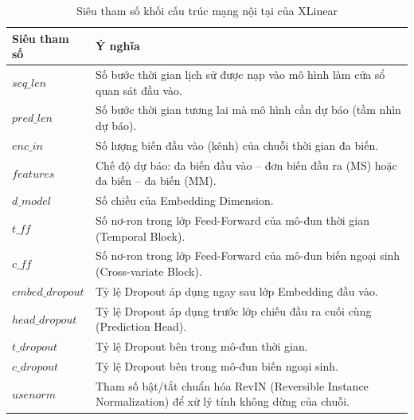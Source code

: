 \begin{table}[H]
\centering
\caption{Siêu tham số khối cấu trúc mạng nội tại của XLinear}
\label{tab:xlinear_structure}
\renewcommand{\arraystretch}{1.3}
\begin{tabular}{p{3.8cm} p{10.5cm}}
\toprule
\textbf{Siêu tham số} & \textbf{Ý nghĩa} \\
\midrule
$seq\_len$ & Số bước thời gian lịch sử được nạp vào mô hình làm cửa sổ quan sát đầu vào. \\
$pred\_len$ & Số bước thời gian tương lai mà mô hình cần dự báo (tầm nhìn dự báo). \\
$enc\_in$ & Số lượng biến đầu vào (kênh) của chuỗi thời gian đa biến. \\
$features$ & Chế độ dự báo: đa biến đầu vào -- đơn biến đầu ra (MS) hoặc đa biến -- đa biến (MM). \\
$d\_model$ & Số chiều của Embedding Dimension. \\
$t\_ff$ & Số nơ-ron trong lớp Feed-Forward của mô-đun thời gian (Temporal Block). \\
$c\_ff$ & Số nơ-ron trong lớp Feed-Forward của mô-đun biến ngoại sinh (Cross-variate Block). \\
$embed\_dropout$ & Tỷ lệ Dropout áp dụng ngay sau lớp Embedding đầu vào. \\
$head\_dropout$ & Tỷ lệ Dropout áp dụng trước lớp chiếu đầu ra cuối cùng (Prediction Head). \\
$t\_dropout$ & Tỷ lệ Dropout bên trong mô-đun thời gian. \\
$c\_dropout$ & Tỷ lệ Dropout bên trong mô-đun biến ngoại sinh. \\
$usenorm$ & Tham số bật/tắt chuẩn hóa RevIN (Reversible Instance Normalization) để xử lý tính không dừng của chuỗi. \\
\bottomrule
\end{tabular}
\end{table}

